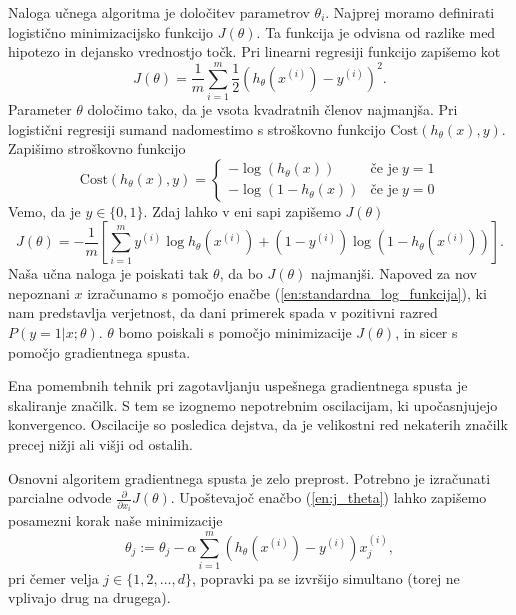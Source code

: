 \documentclass[11pt,a4paper,openany]{book}
\begin{document}
Naloga učnega algoritma je določitev parametrov $\theta_i$. Najprej moramo definirati logistično minimizacijsko funkcijo $J(\theta)$. Ta funkcija je odvisna od razlike med hipotezo in dejansko vrednostjo točk. Pri linearni regresiji funkcijo zapišemo kot
\begin{equation}
	J(\theta) = \frac{1}{m} \sum^m_{i = 1} \frac{1}{2} \left( h_\theta(x^{(i)}) - y^{(i)}\right)^2.
\end{equation}
Parameter $\theta$ določimo tako, da je vsota kvadratnih členov najmanjša. Pri logistični regresiji sumand nadomestimo s stroškovno funkcijo $\text{Cost}(h_\theta(x), y)$. Zapišimo stroškovno funkcijo
\begin{equation}
	\text{Cost}(h_\theta(x), y) = \left\{
	\begin{array}{rl}
		-\log(h_\theta(x)) & \text{če je} \; y = 1 \\
		-\log(1 - h_\theta(x)) & \text{če je} \; y = 0
	\end{array}
	\right.
\end{equation}
Vemo, da je $y \in \{0, 1\}$. Zdaj lahko v eni sapi zapišemo $J(\theta)$
\begin{equation}
	J(\theta) = -\frac{1}{m} \left[ 
		\sum^m_{i = 1}
			y^{(i)} \log h_\theta(x^{(i)}) + (1 - y^{(i)}) \log (1 - h_\theta(x^{(i)}))
	\right].
	\label{en:j_theta}
\end{equation}
Naša učna naloga je poiskati tak $\theta$, da bo $J(\theta)$ najmanjši. Napoved za nov nepoznani $x$ izračunamo s pomočjo enačbe (\ref{en:standardna_log_funkcija}), ki nam predstavlja verjetnost, da dani primerek spada v pozitivni razred $P(y = 1 | x;\theta)$. $\theta$ bomo poiskali s pomočjo minimizacije $J(\theta)$, in sicer s pomočjo gradientnega spusta.

Ena pomembnih tehnik pri zagotavljanju uspešnega gradientnega spusta je skaliranje značilk. S tem se izognemo nepotrebnim oscilacijam, ki upočasnjujejo konvergenco. Oscilacije so posledica dejstva, da je velikostni red nekaterih značilk precej nižji ali višji od ostalih.

Osnovni algoritem gradientnega spusta je zelo preprost. Potrebno je izračunati parcialne odvode $\frac{\partial}{\partial x_i}J(\theta)$. Upoštevajoč enačbo (\ref{en:j_theta}) lahko zapišemo posamezni korak naše minimizacije
\begin{equation}
	\theta_j := \theta_j - \alpha \sum^m_{i = 1}(h_\theta(x^{(i)}) - y^{(i)})x_j^{(i)},
	\label{en:log_reg_update}
\end{equation}  
pri čemer velja $j \in \{1, 2, \ldots, d\}$, popravki pa se izvršijo simultano (torej ne vplivajo drug na drugega).
\end{document}
